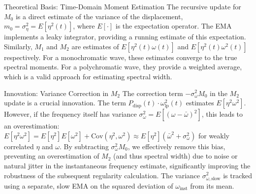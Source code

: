 \documentclass[11pt]{article}
\begin{document}
\begin{theorybox}{Theoretical Basis: Time-Domain Moment Estimation}
The recursive update for $M_0$ is a direct estimate of the variance of the displacement, $m_0 = \sigma_\eta^2 = E[\eta^2(t)]$, where $E[\cdot]$ is the expectation operator. The EMA implements a leaky integrator, providing a running estimate of this expectation. Similarly, $M_1$ and $M_2$ are estimates of $E[\eta^2(t)\omega(t)]$ and $E[\eta^2(t)\omega^2(t)]$ respectively. For a monochromatic wave, these estimates converge to the true spectral moments. For a polychromatic wave, they provide a weighted average, which is a valid approach for estimating spectral width.
\end{theorybox}

\begin{theorybox}{Innovation: Variance Correction in $M_2$}
The correction term $-\sigma^2_{\omega} M_0$ in the $M_2$ update is a crucial innovation. The term $P_{\text{disp}}(t) \cdot \omega_{\text{lp}}^2(t)$ estimates $E[\eta^2 \omega^2]$. However, if the frequency itself has variance $\sigma^2_\omega = E[(\omega - \bar{\omega})^2]$, this leads to an overestimation:
$E[\eta^2 \omega^2] = E[\eta^2] E[\omega^2] + \text{Cov}(\eta^2, \omega^2) \approx E[\eta^2] (\bar{\omega}^2 + \sigma^2_\omega)$ for weakly correlated $\eta$ and $\omega$.
By subtracting $\sigma^2_{\omega} M_0$, we effectively remove this bias, preventing an overestimation of $M_2$ (and thus spectral width) due to noise or natural jitter in the instantaneous frequency estimate, significantly improving the robustness of the subsequent regularity calculation. The variance $\sigma^2_{\omega,\text{slow}}$ is tracked using a separate, slow EMA on the squared deviation of $\omega_{\text{inst}}$ from its mean.
\end{theorybox}
\end{document}
